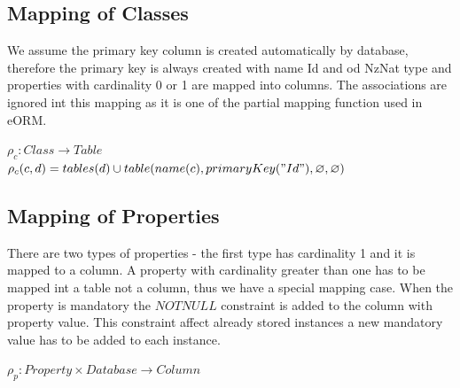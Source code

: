 \documentclass[11pt]{article}
\begin{document}
\subsection{Mapping of Classes}
We assume the primary key column is created automatically by database, therefore the primary key is always created with name Id and od NzNat type and properties with cardinality 0 or 1 are mapped into columns. The associations are ignored int this mapping as it is one of the partial mapping function used in eORM.

\begin{center}
$\rho_{c}: Class \rightarrow Table $ \\ 
$\rho_{c}(c,d) = tables(d) \cup table(name(c), primaryKey("Id"), \varnothing, \varnothing) $
\end{center}



\subsection{Mapping of Properties}
There are two types of properties - the first type has cardinality 1  and it is mapped to a column. A property with cardinality greater than one has to be mapped int a table not a column, thus we have a special mapping case. When the property is mandatory the $NOTNULL$ constraint is added to the column with property value. This constraint affect already stored instances a new mandatory value has to be added to each instance.

$
\rho_p : Property \times Database \rightarrow Column 
$
\end{document}
